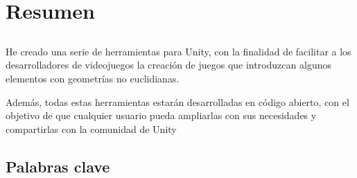 \chapter*{Resumen}

\section*{\tituloPortadaVal}

He creado una serie de herramientas para Unity, con la finalidad de facilitar a los desarrolladores
de videojuegos la creación de juegos que introduzcan algunos elementos con geometrías no 
euclidianas.

Además, todas estas herramientas estarán desarrolladas en código abierto, con el objetivo de que cualquier usuario pueda ampliarlas con sus necesidades y compartirlas con la comunidad de Unity


\section*{Palabras clave}
   
 
   


